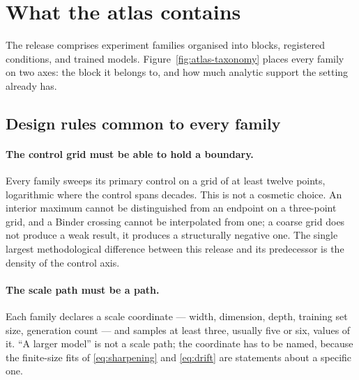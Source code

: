 \section{What the atlas contains}
\label{sec:design}

The release comprises \AtlasTotalFamilies{} experiment families organised into
\AtlasTotalBlocks{} blocks, \AtlasTotalConditions{} registered conditions, and
\AtlasTotalRuns{} trained models. Figure~\ref{fig:atlas-taxonomy} places every
family on two axes: the block it belongs to, and how much analytic support the
setting already has.


\subsection{Design rules common to every family}

\paragraph{The control grid must be able to hold a boundary.}
Every family sweeps its primary control on a grid of at least twelve points,
logarithmic where the control spans decades. This is not a cosmetic choice. An
interior maximum cannot be distinguished from an endpoint on a three-point
grid, and a Binder crossing cannot be interpolated from one; a coarse grid does
not produce a weak result, it produces a structurally negative one. The single
largest methodological difference between this release and its predecessor is
the density of the control axis.

\paragraph{The scale path must be a path.}
Each family declares a scale coordinate --- width, dimension, depth, training
set size, generation count --- and samples at least three, usually five or six,
values of it. ``A larger model'' is not a scale path; the coordinate has to be
named, because the finite-size fits of \eqref{eq:sharpening} and
\eqref{eq:drift} are statements about a specific one.

